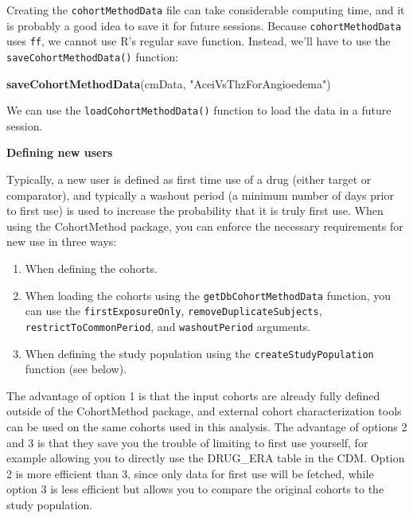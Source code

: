 \documentclass[]{book}
\newenvironment{Shaded}{\begin{snugshade}}{\end{snugshade}}
\newcommand{\KeywordTok}[1]{\textcolor[rgb]{0.13,0.29,0.53}{\textbf{#1}}}
\newcommand{\NormalTok}[1]{#1}
\newcommand{\StringTok}[1]{\textcolor[rgb]{0.31,0.60,0.02}{#1}}
\providecommand{\tightlist}{%
  \setlength{\itemsep}{0pt}\setlength{\parskip}{0pt}}
\begin{document}
Creating the \texttt{cohortMethodData} file can take considerable computing time, and it is probably a good idea to save it for future sessions. Because \texttt{cohortMethodData} uses \texttt{ff}, we cannot use R's regular save function. Instead, we'll have to use the \texttt{saveCohortMethodData()} function:

\begin{Shaded}
\begin{Highlighting}[]
\KeywordTok{saveCohortMethodData}\NormalTok{(cmData, }\StringTok{"AceiVsThzForAngioedema"}\NormalTok{)}
\end{Highlighting}
\end{Shaded}

We can use the \texttt{loadCohortMethodData()} function to load the data in a future session.

\textbf{Defining new users}

Typically, a new user is defined as first time use of a drug (either target or comparator), and typically a washout period (a minimum number of days prior to first use) is used to increase the probability that it is truly first use. When using the CohortMethod package, you can enforce the necessary requirements for new use in three ways:

\begin{enumerate}
\def\labelenumi{\arabic{enumi}.}
\tightlist
\item
  When defining the cohorts.
\item
  When loading the cohorts using the \texttt{getDbCohortMethodData} function, you can use the \texttt{firstExposureOnly}, \texttt{removeDuplicateSubjects}, \texttt{restrictToCommonPeriod}, and \texttt{washoutPeriod} arguments.
\item
  When defining the study population using the \texttt{createStudyPopulation} function (see below).
\end{enumerate}

The advantage of option 1 is that the input cohorts are already fully defined outside of the CohortMethod package, and external cohort characterization tools can be used on the same cohorts used in this analysis. The advantage of options 2 and 3 is that they save you the trouble of limiting to first use yourself, for example allowing you to directly use the DRUG\_ERA table in the CDM. Option 2 is more efficient than 3, since only data for first use will be fetched, while option 3 is less efficient but allows you to compare the original cohorts to the study population.
\end{document}
